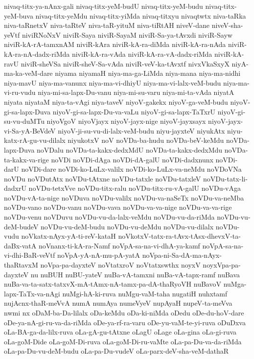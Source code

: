 {nivaq-titx-ya-nAnx-gali
nivaq-titx-yeM-budU
nivaq-titx-yeM-budu
nivaq-titx-yeM-buva
nivaq-titx-yeMdu
nivaq-titx-yiMda
nivaq-titxyu
nivaqtwtx
niva-taRka
niva-taRnetxV
niva-taRteV
niva-taR-yituM
niva-tiRtAH
niveV-dane
niveV-sha-yeVtf
niviRNoNxV
niviR-Saya
niviR-SayaM
niviR-Sa-ya-tAvxdi
niviR-Sayw
niviR-kA-rA-tamxnAM
niviR-kAra
niviR-kA-ra-diMda
niviR-kA-ra-nAda
niviR-kA-ra-nA-dadx-riMda
niviR-kA-ra-vAda
niviR-kA-ra-vA-dadx-riMda
niviR-kA-ravU
niviR-sheVSa
niviR-sheV-Sa-vAda
niviR-veV-ka-tAvxtf
nivxVkaSxyX
niyA-ma-ka-veM-dare
niyama
niyamaH
niya-ma-ga-LiMda
niya-mana
niya-ma-nidhi
niya-mavU
niya-ma-vanunx
niya-ma-vi-dhiyU
niya-ma-vi-lalx-veM-budu
niya-ma-vi-ru-vudu
niya-mi-sa-lapx-Du-vanu
niya-mi-su-varu
niya-mi-ta-vAda
niyatA
niyata
niyataM
niya-ta-vAgi
niya-taveV
niyoV-gakekx
niyoV-ga-veM-budu
niyoV-gi-sa-lapx-Duva
niyoV-gi-sa-lapx-Du-va-vaLu
niyoV-gi-sa-lapx-TaTxrU
niyoV-gi-su-vu-duMTu
niyoVgoV
niyoVjayx
niyoV-jayx-nige
niyoV-jayxsayx
niyoV-jayx-vi-Sa-yA-BeVdeV
niyoV-ji-su-vu-di-lalx-veM-budu
niyu-jayxteV
niyukAtx
niyu-katx-rA-gu-vu-dilalx
niyukotxV
noV
noVDa-ba-hudu
noVDa-beV-keMdu
noVDa-lapx-Duva
noVDalu
noVDa-ta-kakx-dedxMdU
noVDa-ta-kakx-dedxMdu
noVDa-ta-kakx-va-rige
noVDi
noVDi-dAga
noVDi-dA-galU
noVDi-dadxnunx
noVDi-darU
noVDi-dare
noVDi-ko-LuLx-valilx
noVDi-ko-LuLx-va-neMdu
noVDoVNa
noVDu
noVDutAtx
noVDu-tAtxne
noVDu-tatxle
noVDu-tatxleV
noVDu-tatx-li-dadxrU
noVDu-tetxVve
noVDu-titx-ralu
noVDu-titx-ru-vA-galU
noVDu-vAga
noVDu-vA-ta-nige
noVDuva
noVDu-valilx
noVDu-va-naSeTx
noVDu-va-neMba
noVDu-vano
noVDu-vanu
noVDu-vava
noVDu-va-va-nige
noVDu-va-va-rige
noVDu-venu
noVDuvu
noVDu-vu-da-lalx-veMdu
noVDu-vu-da-riMda
noVDu-vu-deM-budeV
noVDu-vu-deM-budu
noVDu-vu-deMdu
noVDu-vu-dilalx
noVDu-vudu
noVkatx-nAyx-yA-ti-reV-kataH
noVkotxV-tatx-ra-tAvx-tAsx-dhevxV-ta-daBx-vatA
noVnanx-ti-kA-ra-Namf
noVpA-sa-na-vi-dhA-ya-kamf
noVpA-sa-na-vi-dhi-BaR-veVtf
noVpA-yA-nA-mu-pA-yatA
noVpa-ni-Sa-dA-ma-nAyx-thaRtavxM
noVpa-pa-dayxteV
noVtatxroV
noVtatxswthx
noyxV
noyxVpa-pa-dayxteV
nu
nuBUH
nuBU-yateV
nuBa-vA-tamxni
nuBa-vA-tapx-ramf
nuBava
nuBa-va-ta-satx-tatxvX-mA-tAmx-nA-tamx-pa-dA-thaRyoVH
nuBavoV
nuMga-lapx-TaTx-va-nAgi
nuMgi-hA-ki-ruva
nuMgu-vaM-taha
nugatiH
nuhxtamf
nujAcnx-thaR-meVvA
numA
numAya
numeVyeV
nupAyaH
nupeV-ta-meVva
nwmi
nx
oDaM-ba-Da-lilalx
oDa-keMdu
oDa-ki-niMda
oDedu
oDe-du-hoV-dare
oDe-ya-nA-gi-ru-va-da-riMda
oDe-ya-rf-ra-varu
oDe-yu-vaM-te-yi-ruva
oDuDxva
oLa-BA-ga-da-lilx-ruva
oLa-gA-gu-tAtxne
oLagU
oLage
oLa-gina
oLa-gi-ruva
oLa-goM-Dide
oLa-goM-Di-ruva
oLa-goM-Di-ru-vaMte
oLa-pa-Du-va-da-riMda
oLa-pa-Du-vu-deM-budu
oLa-pa-Du-vudeV
oLa-parx-deV-sha-veM-dathaR
}
